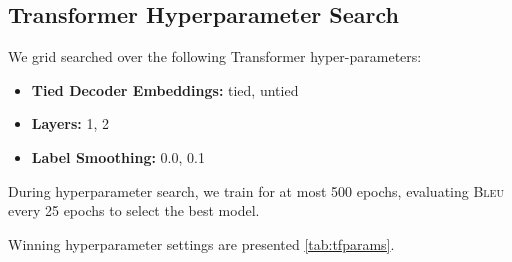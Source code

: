 

\subsection{Transformer Hyperparameter Search}
We grid searched over the following Transformer hyper-parameters:
\begin{itemize}
    \item \textbf{Tied Decoder Embeddings:} tied, untied
    \item \textbf{Layers:} 1, 2
    \item \textbf{Label Smoothing:} 0.0, 0.1
\end{itemize}

During hyperparameter search, we train for at most 500
epochs, evaluating \textsc{Bleu} every 25 epochs to select the best model.

Winning hyperparameter settings are presented \autoref{tab:tfparams}.


